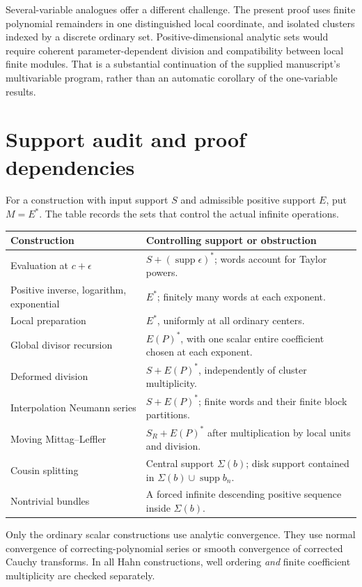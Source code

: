 \documentclass[11pt,letterpaper]{article}
\theoremstyle{definition}
\theoremstyle{remark}
\newcommand{\supp}{\operatorname{supp}}
\numberwithin{equation}{section}
\begin{document}
Several-variable analogues offer a different challenge. The present proof uses finite polynomial remainders in one distinguished local coordinate, and isolated clusters indexed by a discrete ordinary set. Positive-dimensional analytic sets would require coherent parameter-dependent division and compatibility between local finite modules. That is a substantial continuation of the supplied manuscript's multivariable program, rather than an automatic corollary of the one-variable results.

\appendix
\section{Support audit and proof dependencies}\label{app:audit}
For a construction with input support $S$ and admissible positive support $E$, put $M=E^*$. The table records the sets that control the actual infinite operations.
\begin{center}
\begin{tabularx}{\textwidth}{@{}LL@{}}
\toprule
Construction & Controlling support or obstruction\\
\midrule
Evaluation at $c+\epsilon$ & $S+(\supp\epsilon)^*$; words account for Taylor powers.\\[0.3em]
Positive inverse, logarithm, exponential & $E^*$; finitely many words at each exponent.\\[0.3em]
Local preparation & $E^*$, uniformly at all ordinary centers.\\[0.3em]
Global divisor recursion & $E(P)^*$, with one scalar entire coefficient chosen at each exponent.\\[0.3em]
Deformed division & $S+E(P)^*$, independently of cluster multiplicity.\\[0.3em]
Interpolation Neumann series & $S+E(P)^*$; finite words and their finite block partitions.\\[0.3em]
Moving Mittag--Leffler & $S_R+E(P)^*$ after multiplication by local units and division.\\[0.3em]
Cousin splitting & Central support $\Sigma(b)$; disk support contained in $\Sigma(b)\cup\supp b_n$.\\[0.3em]
Nontrivial bundles & A forced infinite descending positive sequence inside $\Sigma(b)$.\\
\bottomrule
\end{tabularx}
\end{center}
Only the ordinary scalar constructions use analytic convergence. They use normal convergence of correcting-polynomial series or smooth convergence of corrected Cauchy transforms. In all Hahn constructions, well ordering \emph{and} finite coefficient multiplicity are checked separately.
\end{document}

